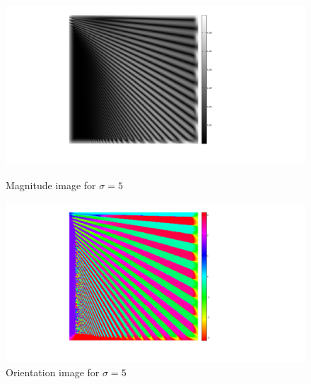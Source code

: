 \documentclass[a4paper,10pt]{article}
\begin{document}
\begin{figure}[ht]
\label{gradmag}
\begin{minipage}[b]{0.45\linewidth}
\centering
\includegraphics[width=\textwidth]{pn1_img/magnitude_sigma5_colorbar}
\caption{Magnitude image for $\sigma=5$}
\end{minipage}
\hspace{0.1cm}
\begin{minipage}[b]{0.45\linewidth}
\centering
\includegraphics[width=\textwidth]{pn1_img/orientation_sigma5}
\caption{Orientation image for $\sigma=5$}
\end{minipage}
\end{figure}
\end{document}

